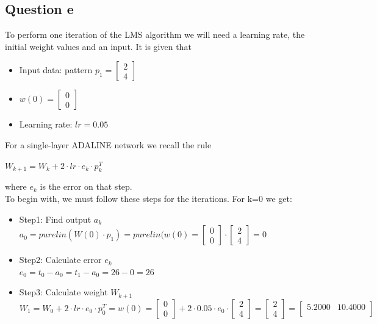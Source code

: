 \subsection{Question e}
\label{Questione}
To perform one iteration of the LMS algorithm we will need a learning rate, the initial weight values and an input. It is given that
\begin{itemize}
	\item Input data: pattern $p_1 = \left[
	\begin{array}{c}
		2 \\
		4
	\end{array}
	\right]
	$
	\item $w(0) = \left[
	\begin{array}{c}
		0 \\
		0
	\end{array}
	\right]
	$
	\item Learning rate: $lr = 0.05$
\end{itemize}
For a single-layer ADALINE network we recall the rule
\begin{center}
	$W_{k+1} = W_k + 2 \cdot lr \cdot e_k \cdot p_k^T$
\end{center}
where $e_k$ is the error on that step.\\

To begin with, we must follow these steps for the iterations. For k=0 we get:
\begin{itemize}
	\item Step1: Find output $a_k$\\
	$a_0 = purelin(W(0) \cdot p_1) = purelin(w(0) = \left[
	\begin{array}{c}
		0 \\
		0
	\end{array}
	\right] \cdot \left[\begin{array}{c}
		2 \\
		4
	\end{array}
	\right] = 0 $
	\item Step2: Calculate error $e_k$\\
	$e_0 = t_0 - a_0 = t_1 - a_0 = 26 - 0 = 26$
	\item Step3: Calculate weight $W_{k+1}$\\
	$W_{1} = W_0 + 2 \cdot lr \cdot e_0 \cdot p_0^T = w(0) = \left[
	\begin{array}{c}
		0 \\
		0
	\end{array}
	\right] + 2 \cdot 0.05 \cdot e_0 \cdot  \left[
	\begin{array}{c}
		2 \\
		4
	\end{array}
	\right] =  \left[
	\begin{array}{c}
		2 \\
		4
	\end{array}
	\right] =  \left[
	\begin{array}{cc}
		5.2000 & 10.4000 \\
	\end{array}
	\right]$
	
\end{itemize}







	

